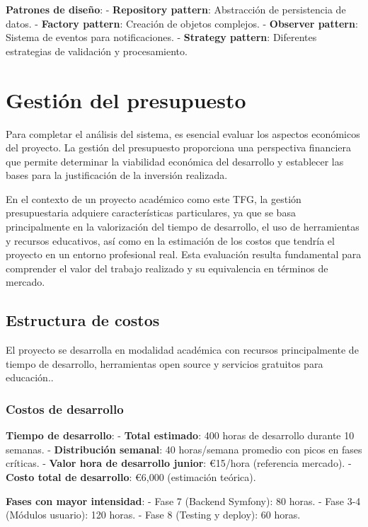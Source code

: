 \documentclass[12pt,a4paper,oneside]{report}
\begin{document}
\textbf{Patrones de diseño}: - \textbf{Repository pattern}: Abstracción
de persistencia de datos. - \textbf{Factory pattern}: Creación de
objetos complejos. - \textbf{Observer pattern}: Sistema de eventos para
notificaciones. - \textbf{Strategy pattern}: Diferentes estrategias de
validación y procesamiento.

\section{Gestión del presupuesto}\label{gestiuxf3n-del-presupuesto}

Para completar el análisis del sistema, es esencial evaluar los aspectos
económicos del proyecto. La gestión del presupuesto proporciona una
perspectiva financiera que permite determinar la viabilidad económica
del desarrollo y establecer las bases para la justificación de la
inversión realizada.

En el contexto de un proyecto académico como este TFG, la gestión
presupuestaria adquiere características particulares, ya que se basa
principalmente en la valorización del tiempo de desarrollo, el uso de
herramientas y recursos educativos, así como en la estimación de los
costos que tendría el proyecto en un entorno profesional real. Esta
evaluación resulta fundamental para comprender el valor del trabajo
realizado y su equivalencia en términos de mercado.

\subsection{Estructura de costos}\label{estructura-de-costos}

El proyecto se desarrolla en modalidad académica con recursos
principalmente de tiempo de desarrollo, herramientas open source y
servicios gratuitos para educación..

\subsubsection{Costos de desarrollo}\label{costos-de-desarrollo}

\textbf{Tiempo de desarrollo}: - \textbf{Total estimado}: 400 horas de
desarrollo durante 10 semanas. - \textbf{Distribución semanal}: 40
horas/semana promedio con picos en fases críticas. - \textbf{Valor hora
de desarrollo junior}: €15/hora (referencia mercado). - \textbf{Costo
total de desarrollo}: €6,000 (estimación teórica).

\textbf{Fases con mayor intensidad}: - Fase 7 (Backend Symfony): 80
horas. - Fase 3-4 (Módulos usuario): 120 horas. - Fase 8 (Testing y
deploy): 60 horas.
\end{document}
